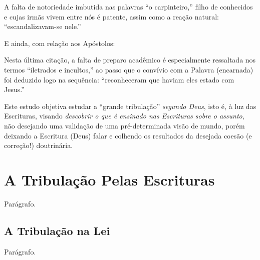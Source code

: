     A falta de notoriedade imbutida nas palavras ``o carpinteiro,'' filho de conhecidos e cujas irmãs vivem entre nós é patente,
    assim como a reação natural: ``escandalizavam-se nele.''

    E ainda, com relação aos Apóstolos:


    Nesta última citação, a falta de preparo acadêmico é especialmente ressaltada nos termos ``iletrados e incultos,'' ao  passo
    que o convívio com a Palavra (encarnada) foi deduzido logo na sequência: ``reconheceram que haviam eles estado com Jesus.''

    Este estudo objetiva  estudar  a  ``grande  tribulação''  \emph{segundo  Deus},  isto  é,  à  luz  das  Escrituras,  visando
    \emph{descobrir o que é ensinado nas Escrituras sobre o assunto}, não desejando uma validação de uma  pré-determinada  visão
    de mundo, porém deixando a Escritura (Deus) falar e colhendo os resultados da desejada coesão (e correção!) doutrinária.



\section{A Tribulação Pelas Escrituras}

    Parágrafo.

\subsection{A Tribulação na Lei}

    Parágrafo.

